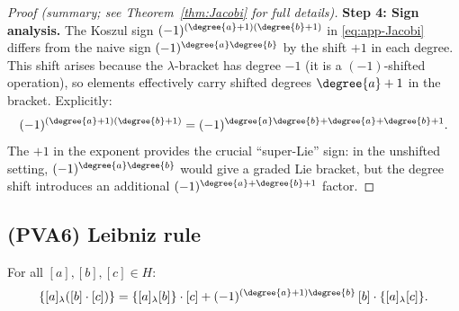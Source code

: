 \begin{proof}[Proof (summary; see Theorem~\ref{thm:Jacobi} for full details)]
\textbf{Step 4: Sign analysis.}
The Koszul sign $(-1)^{(\degree{a}+1)(\degree{b}+1)}$ in \eqref{eq:app-Jacobi} differs from the naive sign $(-1)^{\degree{a}\degree{b}}$ by the shift $+1$ in each degree. This shift arises because the $\lambda$-bracket has degree $-1$ (it is a $(-1)$-shifted operation), so elements effectively carry shifted degrees $\degree{a}+1$ in the bracket. Explicitly:
\[
(-1)^{(\degree{a}+1)(\degree{b}+1)} = (-1)^{\degree{a}\degree{b}+\degree{a}+\degree{b}+1}.
\]
The $+1$ in the exponent provides the crucial ``super-Lie'' sign: in the unshifted setting, $(-1)^{\degree{a}\degree{b}}$ would give a graded Lie bracket, but the degree shift introduces an additional $(-1)^{\degree{a}+\degree{b}+1}$ factor.
\end{proof}

\subsection{(PVA6) Leibniz rule}

\begin{proposition}
\label{prop:app-Leibniz}
For all $[a],[b],[c]\in H$:
\begin{equation}
\label{eq:app-Leibniz}
\{[a]{}_\lambda ([b]\cdot[c])\}
=
\{[a]{}_\lambda [b]\}\cdot [c]
+
(-1)^{(\degree{a}+1)\degree{b}}\,
[b]\cdot\{[a]{}_\lambda [c]\}.
\end{equation}
\end{proposition}

